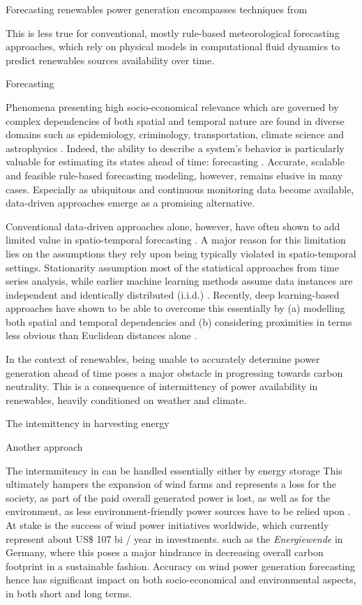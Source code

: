 Forecasting renewables power generation encompasses techniques from

This is less true for conventional, mostly rule-based meteorological forecasting approaches, which rely on physical models in computational fluid dynamics to predict renewables sources availability over time.




Forecasting


Phenomena presenting high socio-economical relevance which are governed by complex dependencies of both spatial and temporal nature are found in diverse domains such as epidemiology, criminology, transportation, climate science and astrophysics \cite{atluri2018datamining}.
Indeed, the ability to describe a system's behavior is particularly valuable for estimating its states ahead of time: forecasting \cite{armstrong2002principles}.
Accurate, scalable and feasible rule-based forecasting modeling, however, remains elusive in many cases.
Especially as ubiquitous and continuous monitoring data become available, data-driven approaches emerge as a promising alternative.

Conventional data-driven approaches alone, however, have often shown to add limited value in spatio-temporal forecasting \cite{makridakis2018waysforward}.
A major reason for this limitation lies on the assumptions they rely upon being typically violated in spatio-temporal settings.
Stationarity assumption most of the statistical approaches from time series analysis, while earlier machine learning methods assume data instances are independent and identically distributed (i.i.d.) \cite{atluri2018datamining}.
Recently, deep learning-based approaches have shown to be able to overcome this essentially by (a) modelling both spatial and temporal dependencies and (b) considering proximities in terms less obvious than Euclidean distances alone \cite{li2018dcrnn, liu2019st-mgcn, wu2019graphwavenet}.

In the context of renewables, being unable to accurately determine power generation ahead of time poses a major obstacle in progressing towards carbon neutrality.
This is a consequence of intermittency of power availability in renewables, heavily conditioned on weather and climate.


The intemittency in harvesting energy


Another approach

The intermmitency in  can be handled essentially either by energy storage
This ultimately hampers the expansion of wind farms and represents a loss for the society, as part of the paid overall generated power is lost, as well as for the environment, as less environment-friendly power sources have to be relied upon \cite{delarue2015intermittency}.
At stake is the success of wind power initiatives worldwide, which currently represent about US\$ 107 bi / year in investments.
such as the \textit{Energiewende} in Germany, where  this poses a major hindrance in decreasing overall carbon footprint in a sustainable fashion.
Accuracy on wind power generation forecasting hence has significant impact on both socio-economical and environmental aspects, in both short and long terms.

